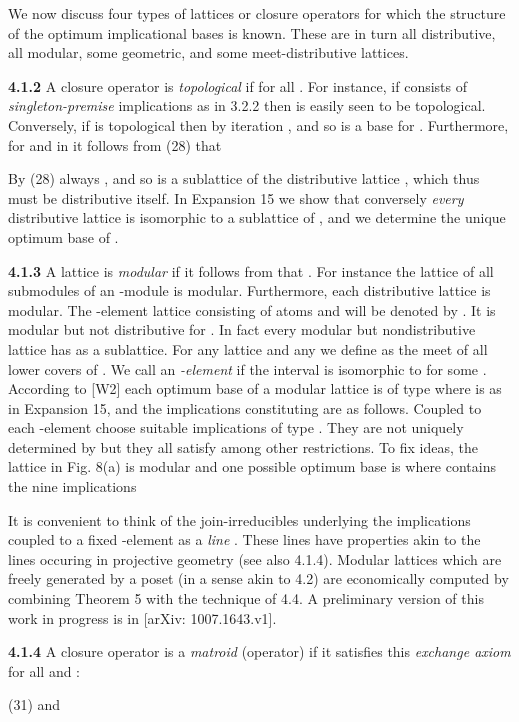 \documentclass[11pt]{article}
\begin{document}
We now discuss four types of lattices or closure operators for which the structure of the optimum implicational bases is known. These are in turn 
all distributive, all modular, some geometric, and some meet-distributive lattices.

{\bf 4.1.2} A closure operator  is {\it topological} if  for all . For instance, if  consists of {\it singleton-premise} implications as in 3.2.2 then  is easily seen to be topological. Conversely, if  is topological then by iteration , and so  is a
base for .
Furthermore, for  and  in  it follows from (28) that

By (28) always , and so  is a sublattice of the distributive lattice , which thus must be distributive itself. 
In Expansion 15 we show that conversely {\it every} distributive lattice  is isomorphic to a sublattice of , and we determine the unique optimum base  of .


{\bf 4.1.3} A lattice  is {\it modular} if it follows from  that . For instance the lattice of all submodules of an -module is modular. Furthermore, each distributive lattice is modular. 
The -element lattice consisting of  atoms and  will be denoted by .  It is modular but not distributive for . In fact every modular but nondistributive lattice has  as a sublattice. For any lattice  and any  we define  as the meet of all lower covers of .  We call  an {\it -element} if the interval  is isomorphic to  for some .  According to [W2] each optimum base  of a modular lattice is of type  where  is as in Expansion 15, and the implications constituting   are as follows. Coupled to each -element  choose  suitable implications of type . They are not uniquely determined by  but they all satisfy  among other restrictions. To fix ideas, the lattice  in Fig. 8(a) is modular and one possible optimum base is  where  contains the nine implications


It is convenient to think of the  join-irreducibles underlying the  implications coupled to a fixed -element as a {\it line} . These lines have properties akin to the lines occuring in projective geometry (see also 4.1.4). Modular lattices which are freely generated by a poset (in a sense akin to 4.2) are economically computed by combining Theorem 5 with the technique of 4.4. A preliminary version of this work in progress is in [arXiv: 1007.1643.v1].


{\bf 4.1.4} A closure operator  is a {\it matroid} (operator) if it satisfies this {\it exchange axiom} for all  and :

(31) \quad  and 
\end{document}
